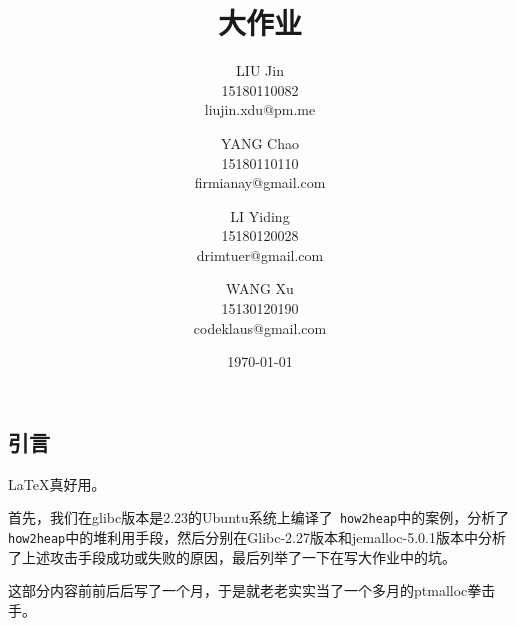 \documentclass{article}
\title{\Huge{\classname{} 大作业}}
\author{LIU Jin\\
15180110082 \\
\small{liujin.xdu@pm.me} \and
YANG Chao\\
15180110110 \\
\small{firmianay@gmail.com} \and
LI Yiding\\
15180120028 \\
\small{drimtuer@gmail.com} \and
WANG Xu\\
15130120190 \\
\small{codeklaus@gmail.com}
}
\date{\today}
\begin{document}
\maketitle

\renewcommand{\contentsname}{目录}

\newpage
\tableofcontents
\newpage

\begin{center}
    \section{引言}
\end{center}

\setlength{\parindent}{2em}

 \LaTeX 真好用。
 
 首先，我们在glibc版本是2.23的Ubuntu系统上编译了\verb+ how2heap+中的案例，分析了\verb+ how2heap+中的堆利用手段，然后分别在Glibc-2.27版本和jemalloc-5.0.1版本中分析了上述攻击手段成功或失败的原因，最后列举了一下在写大作业中的坑。
 
 这部分内容前前后后写了一个月，于是就老老实实当了一个多月的ptmalloc拳击手。

\newpage
% 

% 



% 

% 
\end{document}
